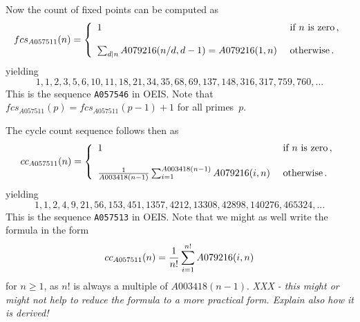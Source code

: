 \documentclass[11pt]{article} %
\newcommand{\eeq}{\end{equation}}
\newcommand{\beql}[1]{\begin{equation}\label{#1}}
\def\sratio#1#2{{#1/#2}}
\def\oratio#1#2{{#1\over #2}}
\newcommand{\EISseq}[1]{{\tt #1}}
\begin{document}
Now the count of fixed points can be computed as
\beql{EQfc_A057511} %
\aligned
fcs_{A057511}(n) = \left\{ \begin{array}{lll}
1 & \mbox{~if~}n\mbox{~is~zero}\, , \\
\\
\sum_{d | n} A079216(\sratio{n}{d},d-1) =  A079216(1,n) & \mbox{~otherwise}\, . \\
\end{array} \right.
\endaligned
\eeq
yielding
$$
1,1,2,3,5,6,10,11,18,21,34,35,68,69,137,148,316,317,759,760,...
$$
This is the sequence \EISseq{A057546} in OEIS.
Note that $fcs_{A057511}(p) = fcs_{A057511}(p-1)+1$ for all primes~$p$.

The cycle count sequence follows then as
\beql{EQcc_A057511} %
\aligned
cc_{A057511}(n) = \left\{ \begin{array}{lll}
1 & \mbox{~if~}n\mbox{~is~zero}\, , \\
\\
\oratio{1}{A003418(n-1)} \sum_{i=1}^{A003418(n-1)} A079216(i,n) & \mbox{~otherwise}\, . \\
\end{array} \right.
\endaligned
\eeq
yielding
$$
 1,1,2,4,9,21,56,153,451,1357,4212,13308,42898,140276,465324,...
$$
This is the sequence \EISseq{A057513} in OEIS.
Note that we might as well write the formula in the form
\beql{EQcc_A057511v2} %
\aligned
cc_{A057511}(n) =
\oratio{1}{n!} \sum_{i=1}^{n!} A079216(i,n)
\endaligned
\eeq
for $n{\ge}1$, as $n!$ is always a multiple of $A003418(n-1)$.
{\em XXX - this might or might not help to reduce the formula
to a more practical form. Explain also how it is derived!}

\end{document}
